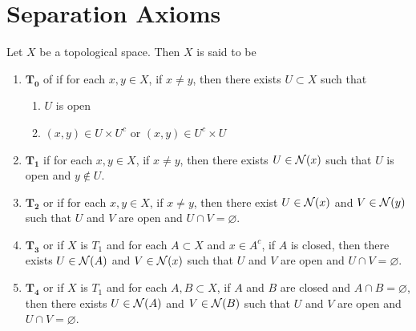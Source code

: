 \documentclass{book}
\begin{document}
	
	
	
	
	
	
	
	
	
	
	
	
	
	
	
	
	
	
	
	
	
	
	
	
	
	
	
	\newpage
	\section{Separation Axioms}
	
	\begin{defn} 
		Let $X$ be a topological space. Then $X$ is said to be 
		\begin{enumerate}
			\item $\mathbf{T_0}$ of  if for each $x,y \in X$, if $x \neq y$, then there exists $U \subset X$ such that 
			\begin{enumerate}
				\item $U$ is open 
				\item $(x, y) \in U \times U^c$ or $(x,y) \in U^c \times U$
			\end{enumerate}
			\item $\mathbf{T_1}$ if for each $x,y \in X$, if $x \neq y$, then there exists $U \in \mathcal{N}(x)$ such that $U$ is open and $y \not \in U$.
			\item $\mathbf{T_2}$ or  if for each $x,y \in X$, if $x \neq y$, then there exist $U \in \mathcal{N}(x)$ and $V \in \mathcal{N}(y)$ such that $U$ and $V$ are open and $U \cap V = \varnothing$.
			\item $\mathbf{T_3}$ or  if $X$ is $T_1$ and for each $A \subset X$ and $x \in A^c$, if $A$ is closed, then there exists $U \in \mathcal{N}(A)$ and $V \in \mathcal{N}(x)$ such that $U$ and $V$ are open and $U \cap V = \varnothing$.
			\item $\mathbf{T_4}$ or  if $X$ is $T_1$ and for each $A,B \subset X$, if $A$ and $B$ are closed and $A \cap B = \varnothing$, then there exists $U \in \mathcal{N}(A)$ and $V \in \mathcal{N}(B)$ such that $U$ and $V$ are open and $U \cap V = \varnothing$.
		\end{enumerate}
	\end{defn}
\end{document}
